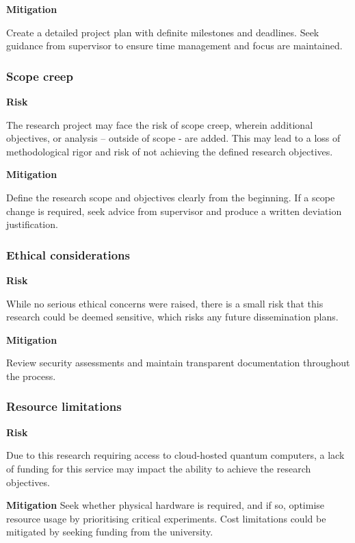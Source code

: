 \textbf{Mitigation}

Create a detailed project plan with definite milestones and deadlines. Seek guidance from supervisor to ensure time management and focus are maintained.
% 
\subsubsection{Scope creep}

\textbf{Risk}

The research project may face the risk of scope creep, wherein additional objectives, or analysis – outside of scope - are added. This may lead to a loss of methodological rigor and risk of not achieving the defined research objectives.

\textbf{Mitigation}

Define the research scope and objectives clearly from the beginning. If a scope change is required, seek advice from supervisor and produce a written deviation justification.
% 
\subsubsection{Ethical considerations}

\textbf{Risk}

While no serious ethical concerns were raised, there is a small risk that this research could be deemed sensitive, which risks any future dissemination plans.

\textbf{Mitigation}

Review security assessments and maintain transparent documentation throughout the process.
% 
\subsubsection{Resource limitations}

\textbf{Risk}

Due to this research requiring access to cloud-hosted quantum computers, a lack of funding for this service may impact the ability to achieve the research objectives.

\textbf{Mitigation}
Seek whether physical hardware is required, and if so, optimise resource usage by prioritising critical experiments. Cost limitations could be mitigated by seeking funding from the university.
